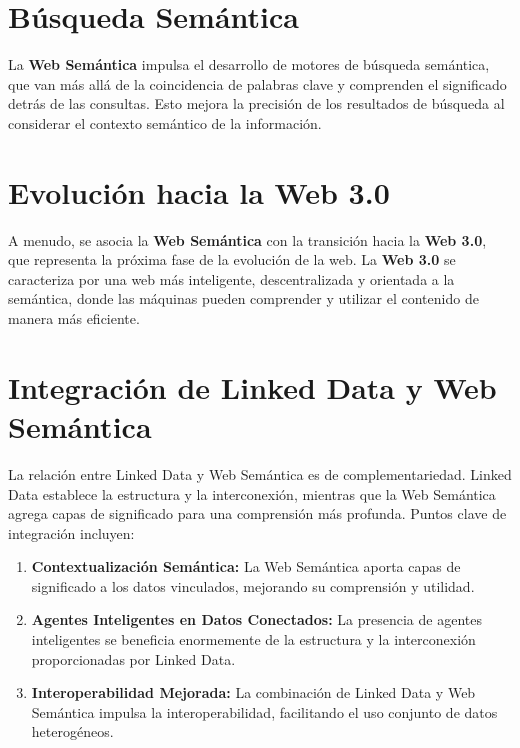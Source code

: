 \documentclass[11pt]{report}
\begin{document}
	\section{Búsqueda Semántica}

	La \textbf{Web Semántica} impulsa el desarrollo de motores de búsqueda semántica, que van más allá de la coincidencia de palabras clave y comprenden el significado detrás de las consultas. Esto mejora la precisión de los resultados de búsqueda al considerar el contexto semántico de la información.

	\section{Evolución hacia la Web 3.0}

	A menudo, se asocia la \textbf{Web Semántica} con la transición hacia la \textbf{Web 3.0}, que representa la próxima fase de la evolución de la web. La \textbf{Web 3.0} se caracteriza por una web más inteligente, descentralizada y orientada a la semántica, donde las máquinas pueden comprender y utilizar el contenido de manera más eficiente.

	\section{Integración de Linked Data y Web Semántica}
	
	La relación entre Linked Data y Web Semántica es de complementariedad. Linked Data establece la estructura y la interconexión, mientras que la Web Semántica agrega capas de significado para una comprensión más profunda. Puntos clave de integración incluyen:
	
	\begin{enumerate}
		\item \textbf{Contextualización Semántica:} La Web Semántica aporta capas de significado a los datos vinculados, mejorando su comprensión y utilidad.
		
		\item \textbf{Agentes Inteligentes en Datos Conectados:} La presencia de agentes inteligentes se beneficia enormemente de la estructura y la interconexión proporcionadas por Linked Data.
		
		\item \textbf{Interoperabilidad Mejorada:} La combinación de Linked Data y Web Semántica impulsa la interoperabilidad, facilitando el uso conjunto de datos heterogéneos.
	\end{enumerate}
	
\end{document}
